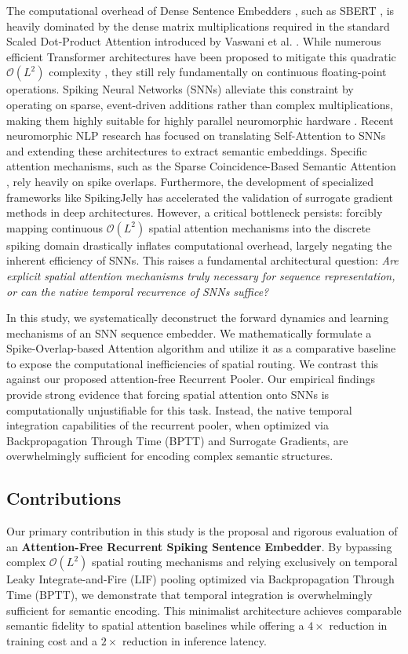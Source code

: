 \documentclass[preprint,12pt]{elsarticle}
\begin{document}
The computational overhead of Dense Sentence Embedders \citep{devlin2018bert}, such as SBERT \citep{reimers2019sentence}, is heavily dominated by the dense matrix multiplications required in the standard Scaled Dot-Product Attention introduced by Vaswani et al. \cite{vaswani2017attention}. While numerous efficient Transformer architectures have been proposed to mitigate this quadratic $\mathcal{O}(L^2)$ complexity \citep{tay2022efficient}, they still rely fundamentally on continuous floating-point operations. Spiking Neural Networks (SNNs) alleviate this constraint by operating on sparse, event-driven additions rather than complex multiplications, making them highly suitable for highly parallel neuromorphic hardware \citep{roy2019towards}. Recent neuromorphic NLP research has focused on translating Self-Attention to SNNs \citep{li2022spikeformer, zhu2023spikegpt} and extending these architectures to extract semantic embeddings. Specific attention mechanisms, such as the Sparse Coincidence-Based Semantic Attention \citep{coincidence2026}, rely heavily on spike overlaps. Furthermore, the development of specialized frameworks like SpikingJelly \citep{fang2023spikingjelly} has accelerated the validation of surrogate gradient methods in deep architectures. However, a critical bottleneck persists: forcibly mapping continuous $\mathcal{O}(L^2)$ spatial attention mechanisms into the discrete spiking domain drastically inflates computational overhead, largely negating the inherent efficiency of SNNs. This raises a fundamental architectural question: \textit{Are explicit spatial attention mechanisms truly necessary for sequence representation, or can the native temporal recurrence of SNNs suffice?}

In this study, we systematically deconstruct the forward dynamics and learning mechanisms of an SNN sequence embedder. We mathematically formulate a Spike-Overlap-based Attention algorithm and utilize it as a comparative baseline to expose the computational inefficiencies of spatial routing. We contrast this against our proposed attention-free Recurrent Pooler. Our empirical findings provide strong evidence that forcing spatial attention onto SNNs is computationally unjustifiable for this task. Instead, the native temporal integration capabilities of the recurrent pooler, when optimized via Backpropagation Through Time (BPTT) and Surrogate Gradients, are overwhelmingly sufficient for encoding complex semantic structures.

\subsection*{Contributions}
Our primary contribution in this study is the proposal and rigorous evaluation of an \textbf{Attention-Free Recurrent Spiking Sentence Embedder}. By bypassing complex $\mathcal{O}(L^2)$ spatial routing mechanisms and relying exclusively on temporal Leaky Integrate-and-Fire (LIF) pooling optimized via Backpropagation Through Time (BPTT), we demonstrate that temporal integration is overwhelmingly sufficient for semantic encoding. This minimalist architecture achieves comparable semantic fidelity to spatial attention baselines while offering a $4\times$ reduction in training cost and a $2\times$ reduction in inference latency. 
\end{document}
